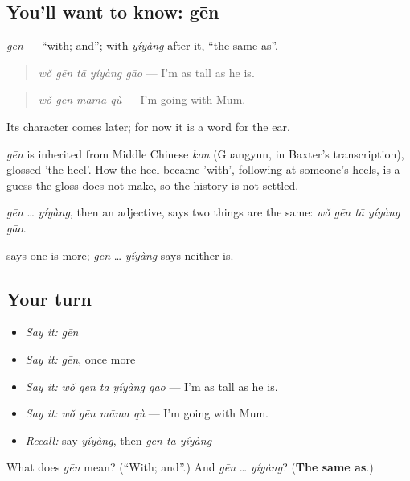 \subsection*{You'll want to know: gēn}
\emph{gēn} — \textquotedblleft{}with; and\textquotedblright{}; with \emph{yíyàng} after it, \textquotedblleft{}the same as\textquotedblright{}.

\begin{quote}
\emph{wǒ gēn tā yíyàng gāo} — I'm as tall as he is.
\end{quote}

\begin{quote}
\emph{wǒ gēn māma qù} — I'm going with Mum.
\end{quote}

Its character comes later; for now it is a word for the ear.

\begin{cousinweb}
\emph{gēn} is inherited from Middle Chinese \emph{kon} (Guangyun, in Baxter's transcription), glossed 'the heel'. How the heel became 'with', following at someone's heels, is a guess the gloss does not make, so the history is not settled.
\end{cousinweb}

\begin{grammarlens}[title={What you've built}]
\emph{gēn} … \emph{yíyàng}, then an adjective, says two things are the same: \emph{wǒ gēn tā yíyàng gāo}.

 says one is more; \emph{gēn} … \emph{yíyàng} says neither is.
\end{grammarlens}

\subsection*{Your turn}
\begin{itemize}
\raggedright
  \item \emph{Say it:} \emph{gēn}
  \item \emph{Say it:} \emph{gēn}, once more
  \item \emph{Say it:} \emph{wǒ gēn tā yíyàng gāo} — I'm as tall as he is.
  \item \emph{Say it:} \emph{wǒ gēn māma qù} — I'm going with Mum.
  \item \emph{Recall:} say \emph{yíyàng}, then \emph{gēn tā yíyàng}
\end{itemize}

\begin{tcolorbox}[breakable,colback=teal!4,colframe=teal!35!black,title={Before you move on}]
What does \emph{gēn} mean? (\textquotedblleft{}With; and\textquotedblright{}.) And \emph{gēn} … \emph{yíyàng}? (\textbf{The same as}.)
\end{tcolorbox}
